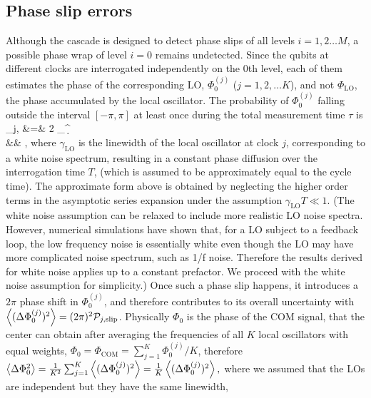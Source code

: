 \subsection{Phase slip errors}
Although the cascade is designed to detect phase slips of all levels $i=1,2\dots
M$, a possible phase wrap of level $i=0$ remains undetected. Since the
qubits at different clocks are interrogated independently on the $0$th
level, each of them estimates the phase of the corresponding LO, $\Phi_0^{(j)}$
($j=1,2, \dots K$), and not $\Phi_\mathrm{LO}$, the phase accumulated by the
local oscillator.
The probability of $\Phi_0^{(j)}$ falling outside the interval $[-\pi,\pi]$ at least once during the total
measurement time $\tau$ is
\bal
	\PP_{j,} &=& 2 \intop_\pi^{\infty}\d{\phi}
	\exp{} \approx 
	\nonumber\\
	&\approx&
	\exp{},
\eal
where $\gamma_\mathrm{LO}$ is the linewidth of the local oscillator at clock $j$,
corresponding to a white noise spectrum, resulting in a constant phase 
diffusion over the interrogation time $T$, (which is assumed to be
approximately equal to the cycle time). The approximate form above is obtained
by neglecting the higher order terms in the asymptotic series expansion under the
assumption $\gamma_\mathrm{LO}T \ll 1$. 
(The white noise assumption can be relaxed to include more realistic LO
noise spectra.
However, numerical simulations have shown that, for a LO subject to a feedback
loop, the low frequency noise is essentially white even though the LO may have
more complicated noise spectrum, such as 1/f noise. Therefore the results
derived for white noise applies up to a constant prefactor.
\cite{Borregaard2013} We proceed with the white noise assumption for
simplicity.) Once such a phase slip happens, it
introduces a $2\pi$ phase shift in $\Phi_0^{(j)}$, and therefore contributes to
its overall uncertainty with $\left< (\Delta\Phi_0^{(j)})^2 \right> = (2\pi)^2
\mathcal{P}_{j,\mathrm{slip}}$. Physically $\Phi_0$ is the phase of the COM signal, that
the center can obtain after averaging the frequencies of all $K$ local
oscillators with equal weights, $\Phi_0 = \Phi_\mathrm{COM} = \sum_{j=1}^K
\Phi_{0}^{(j)}/K$, therefore
$
	\left< \Delta\Phi_0^2 \right> = \frac{1}{K^2}\sum_{j=1}^K \left< (\Delta\Phi_0^{(j)})^2 \right> =
	\frac{1}{K}\left< (\Delta\Phi_0^{(j)})^2 \right>,
$
where we assumed that the LOs are independent but they have the same linewidth,
